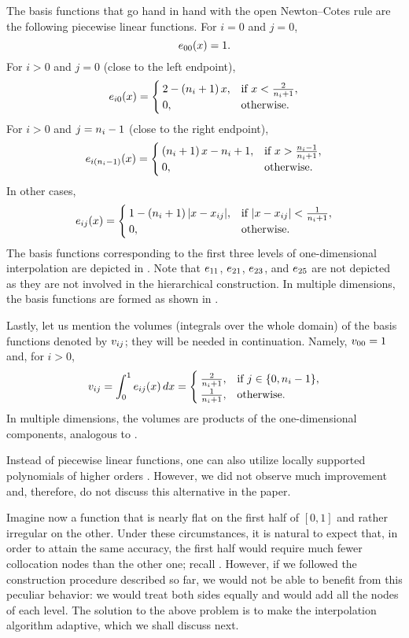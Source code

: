 The basis functions that go hand in hand with the open Newton--Cotes rule are
the following piecewise linear functions. For $i = 0$ and $j = 0$,
\[
  e_{00}(x) = 1.
\]
For $i > 0$ and $j = 0$ (close to the left endpoint),
\[
  e_{i0}(x) = \begin{cases}
    2 - \left( n_i + 1 \right) x, & \text{if } x < \frac{2}{n_i + 1}, \\
    0, & \text{otherwise}.
  \end{cases}
\]
For $i > 0$ and $j = n_i - 1$ (close to the right endpoint),
\[
  e_{i(n_i - 1)}(x) = \begin{cases}
    \left( n_i + 1 \right) x - n_i + 1, & \text{if } x > \frac{n_i - 1}{n_i + 1}, \\
    0, & \text{otherwise}.
  \end{cases}
\]
In other cases,
\[
  e_{ij}(x) = \begin{cases}
    1 - \left( n_i + 1 \right)|x - x_{ij}|, & \text{if } |x - x_{ij}| < \frac{1}{n_i + 1}, \\
    0, & \text{otherwise}.
  \end{cases}
\]
The basis functions corresponding to the first three levels of one-dimensional
interpolation are depicted in . Note that $e_{11}$, $e_{21}$,
$e_{23}$, and $e_{25}$ are not depicted as they are not involved in the
hierarchical construction. In multiple dimensions, the basis functions are
formed as shown in .


Lastly, let us mention the volumes (integrals over the whole domain) of the
basis functions denoted by $v_{ij}$; they will be needed in continuation.
Namely, $v_{00} = 1$ and, for $i > 0$,
\begin{equation} \elab{volume}
  \w_{ij} = \int_0^1 \e_{ij}(\x) \, \d\x = \begin{cases}
    \frac{2}{\n_i + 1}, & \text{if } j \in \{ 0, \n_i - 1 \}, \\
    \frac{1}{\n_i + 1}, & \text{otherwise}.
  \end{cases}
\end{equation}
In multiple dimensions, the volumes are products of the one-dimensional
components, analogous to .

\begin{remark}
Instead of piecewise linear functions, one can also utilize locally supported
polynomials of higher orders \cite{jakeman2012}. However, we did not observe
much improvement and, therefore, do not discuss this alternative in the paper.
\end{remark}

Imagine now a function that is nearly flat on the first half of $[0, 1]$ and
rather irregular on the other. Under these circumstances, it is natural to
expect that, in order to attain the same accuracy, the first half would require
much fewer collocation nodes than the other one; recall .
However, if we followed the construction procedure described so far, we would
not be able to benefit from this peculiar behavior: we would treat both sides
equally and would add all the nodes of each level. The solution to the above
problem is to make the interpolation algorithm adaptive, which we shall discuss
next.
